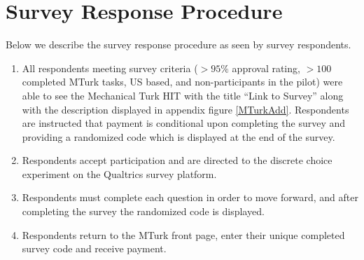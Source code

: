 \documentclass[a4paper, 11pt]{article}
\begin{document}
\section{Survey Response Procedure}
\label{app:procedure}
Below we describe the survey response procedure as seen by survey respondents.
\begin{enumerate}
\item All respondents meeting survey criteria ($>95\%$ approval rating, $>100$ completed MTurk tasks, US based, and non-participants in the pilot) were able to see the Mechanical Turk HIT with the title ``Link to Survey'' along with the description displayed in appendix figure \ref{MTurkAdd}. Respondents are instructed that payment is conditional upon completing the survey and providing a randomized code which is displayed at the end of the survey.
\item Respondents accept participation and are directed to the discrete choice experiment on the Qualtrics survey platform.
\item Respondents must complete each question in order to move forward, and after completing the survey the randomized code is displayed.
\item Respondents return to the MTurk front page, enter their unique completed survey code and receive payment.
\end{enumerate}
\end{document}
